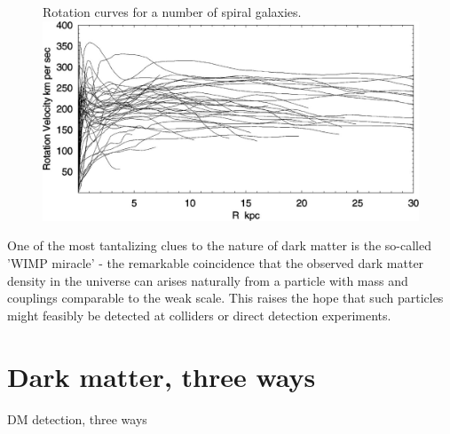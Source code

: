 \strictpagecheck
\begin{figure}
  \begin{sidecaption}
    {Rotation curves for a number of spiral galaxies. \citep{Sofue2001}}
  \includegraphics[width=\textwidth]{images/rotation_curves}
\end{sidecaption}
\end{figure}
One of the most tantalizing clues to the nature of dark matter is the so-called 'WIMP miracle' - the remarkable coincidence that the observed dark matter density in the universe can arises naturally from a particle with mass and couplings comparable to the weak scale. This raises the hope that such particles might feasibly be detected at colliders or direct detection experiments.

\section{Dark matter, three ways}\label{dark-matter-three-ways}

\begin{marginfigure}
  \caption{DM detection, three ways}
\end{marginfigure}


